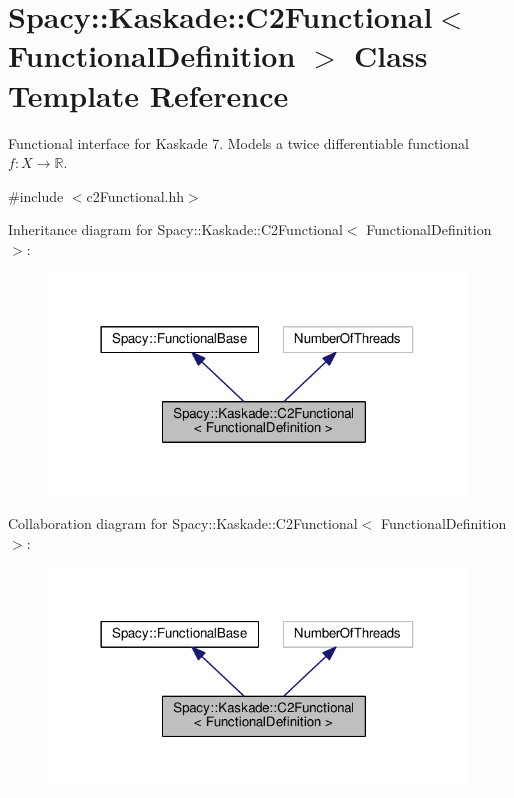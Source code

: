 \hypertarget{classSpacy_1_1Kaskade_1_1C2Functional}{}\section{Spacy\+:\+:Kaskade\+:\+:C2\+Functional$<$ Functional\+Definition $>$ Class Template Reference}
\label{classSpacy_1_1Kaskade_1_1C2Functional}


Functional interface for Kaskade 7. Models a twice differentiable functional $f:X\rightarrow \mathbb{R}$.  




{\ttfamily \#include $<$c2\+Functional.\+hh$>$}



Inheritance diagram for Spacy\+:\+:Kaskade\+:\+:C2\+Functional$<$ Functional\+Definition $>$\+:
\nopagebreak
\begin{figure}[H]
\begin{center}
\leavevmode
\includegraphics[width=314pt]{classSpacy_1_1Kaskade_1_1C2Functional__inherit__graph}
\end{center}
\end{figure}


Collaboration diagram for Spacy\+:\+:Kaskade\+:\+:C2\+Functional$<$ Functional\+Definition $>$\+:
\nopagebreak
\begin{figure}[H]
\begin{center}
\leavevmode
\includegraphics[width=314pt]{classSpacy_1_1Kaskade_1_1C2Functional__coll__graph}
\end{center}
\end{figure}
